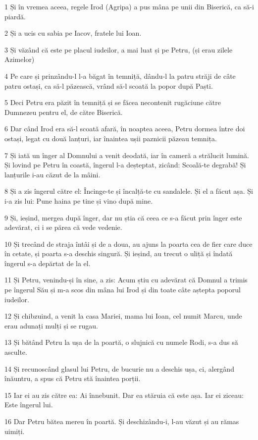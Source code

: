 \par 1 Și în vremea aceea, regele Irod (Agripa) a pus mâna pe unii din Biserică, ca să-i piardă.
\par 2 Și a ucis cu sabia pe Iacov, fratele lui Ioan.
\par 3 Și văzând că este pe placul iudeilor, a mai luat și pe Petru, (și erau zilele Azimelor)
\par 4 Pe care și prinzându-l l-a băgat în temniță, dându-l la patru străji de câte patru ostași, ca să-l păzească, vrând să-l scoată la popor după Paști.
\par 5 Deci Petru era păzit în temniță și se făcea necontenit rugăciune către Dumnezeu pentru el, de către Biserică.
\par 6 Dar când Irod era să-l scoată afară, în noaptea aceea, Petru dormea între doi ostași, legat cu două lanțuri, iar înaintea ușii paznicii păzeau temnița.
\par 7 Și iată un înger al Domnului a venit deodată, iar în cameră a strălucit lumină. Și lovind pe Petru în coastă, îngerul l-a deșteptat, zicând: Scoală-te degrabă! Și lanțurile i-au căzut de la mâini.
\par 8 Și a zis îngerul către el: Încinge-te și încalță-te cu sandalele. Și el a făcut așa. Și i-a zis lui: Pune haina pe tine și vino după mine.
\par 9 Și, ieșind, mergea după înger, dar nu știa că ceea ce s-a făcut prin înger este adevărat, ci i se părea că vede vedenie.
\par 10 Și trecând de straja întâi și de a doua, au ajuns la poarta cea de fier care duce în cetate, și poarta s-a deschis singură. Și ieșind, au trecut o uliță și îndată îngerul s-a depărtat de la el.
\par 11 Și Petru, venindu-și în sine, a zis: Acum știu cu adevărat că Domnul a trimis pe îngerul Său și m-a scos din mâna lui Irod și din toate câte aștepta poporul iudeilor.
\par 12 Și chibzuind, a venit la casa Mariei, mama lui Ioan, cel numit Marcu, unde erau adunați mulți și se rugau.
\par 13 Și bătând Petru la ușa de la poartă, o slujnică cu numele Rodi, s-a dus să asculte.
\par 14 Și recunoscând glasul lui Petru, de bucurie nu a deschis ușa, ci, alergând înăuntru, a spus că Petru stă înaintea porții.
\par 15 Iar ei au zis către ea: Ai înnebunit. Dar ea stăruia că este așa. Iar ei ziceau: Este îngerul lui.
\par 16 Dar Petru bătea mereu în poartă. Și deschizându-i, l-au văzut și au rămas uimiți.
